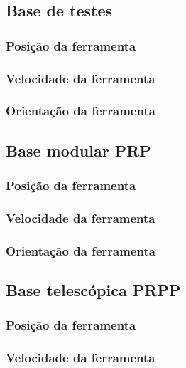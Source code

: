 \subsection{Base de testes} \label{sec::res_testes}

\subsubsection{Posição da ferramenta}

\subsubsection{Velocidade da ferramenta}

\subsubsection{Orientação da ferramenta}

\subsection{Base modular PRP} \label{sec::res_prp}

\subsubsection{Posição da ferramenta}

\subsubsection{Velocidade da ferramenta}

\subsubsection{Orientação da ferramenta}

\subsection{Base telescópica PRPP} \label{sec::res_prpp}

\subsubsection{Posição da ferramenta}

\subsubsection{Velocidade da ferramenta}

